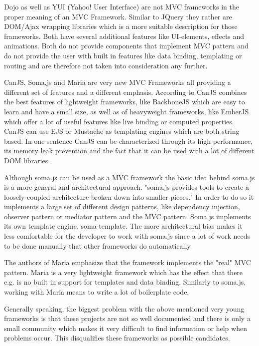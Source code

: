 Dojo as well as YUI (Yahoo! User Interface) are not MVC frameworks in the proper meaning of an MVC Framework.
Similar to JQuery they rather are DOM/Ajax wrapping libraries which is a more suitable description for those frameworks.
Both have several additional features like UI-elements, effects and animations.
Both do not provide components that implement MVC pattern and do not provide the user with built in features like data binding, templating or routing and are therefore not taken into consideration any further.

CanJS, Soma.js and Maria are very new MVC Frameworks all providing a different set of features and a different emphasis.
According to \autocite{tech-ana:canJS-presentation} CanJS combines the best features of lightweight frameworks, like BackboneJS which are easy to learn and have a small size, as well as of heavyweight frameworks, like EmberJS which offer a lot of useful features like live binding or computed properties.
CanJS can use EJS or Mustache as templating engines which are both string based.
In one sentence CanJS can be characterized through its high performance, its memory leak prevention and the fact that it can be used with a lot of different DOM libraries.

Although soma.js can be used as a MVC framework the basic idea behind soma.js is a more general and architectural approach.
"soma.js  provides tools to create a loosely-coupled architecture broken down into smaller pieces." \autocite{tech-ana:somaJS} In order to do so it implements a large set of different design patterns, like dependency injection, observer pattern or mediator pattern and the MVC pattern.
Soma.js implements its own template engine, soma-template.
The more architectural bias makes it less comfortable for the developer to work with soma.js since a lot of work needs to be done manually that other frameworks do automatically.

The authors of Maria emphasize that the framework implements the "real" MVC pattern.
Maria is a very lightweight framework which has the effect that there e.g. is no built in support for templates and data binding.
Similarly to soma.js, working with Maria means to write a lot of boilerplate code.

Generally speaking, the biggest problem with the above mentioned very young frameworks is that these projects are not so well documented and there is only a small community which makes it very difficult to find information or help when problems occur.
This disqualifies these frameworks as possible candidates.


